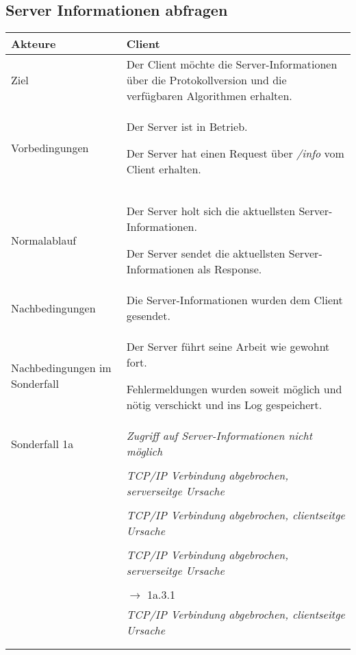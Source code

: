 \documentclass[a4paper,10pt,titlepage]{article}
\makeatletter
\newcommand\novspace{\@minipagetrue}
\newenvironment{owncompactitem}{%
\compactitem
}{%
\@finalstrut\@arstrutbox
\@nameuse{endcompactitem}%
\aftergroup\let\aftergroup\@finalstrut\aftergroup\@gobble
}
\newenvironment{owncompactenum}{%
\compactenum
}{%
\@finalstrut\@arstrutbox
\@nameuse{endcompactenum}%
\aftergroup\let\aftergroup\@finalstrut\aftergroup\@gobble
}
\newcommand{\usecase}[7]
{\subsection{#1}
\setlength{\extrarowheight}{2pt}
\begin{tabular}{|p{0.2\textwidth}|p{0.9\textwidth}|}
\hline
  Akteure & #2\\\hline
  Ziel & #3\\\hline
  Vorbedingungen & \novspace
  	\begin{owncompactitem}[-] #4 \end{owncompactitem} \\\hline
  Normalablauf & \vspace{-7pt}
  	\begin{owncompactenum}[1.] #6 \end{owncompactenum} \\\hline
  Nachbedingungen & \novspace
  	\begin{owncompactitem}[-] #5 \end{owncompactitem} \\\hline
  #7
\end{tabular}
}
\newcommand{\sonderfall}[4][\empty]
{
Sonderfall #2 & \vspace{-10pt}
	\textit{#3}
	\begin{owncompactenum}[{#2}.1] {#4} \end{owncompactenum}
  	\ifthenelse{\equal{#1}{\empty}}
    	{\\\hline} %
    	{\ensuremath{\rightarrow} #1 \\ [+1pt] \hline} %

}
\newcommand{\kurzersonderfall}[3][\empty]
{
Sonderfall #2 & \vspace{-10pt}
	\textit{#3}
  	\ifthenelse{\equal{#1}{\empty}}
    	{\\\hline} %
    	{\\&\ensuremath{\rightarrow} #1 \\ [+1pt] \hline} %

}
\newcommand{\sondernachbedingung}[1]
{
Nachbedingungen im Sonderfall& \novspace
	\begin{owncompactitem}[-]
		#1
	\end{owncompactitem} \\\hline
}
\makeatother
\begin{document}
\usecase{Server Informationen abfragen}{Client}%
{%
Der Client möchte die Server-Informationen über die Protokollversion und die verfügbaren Algorithmen erhalten.
}{%
\item Der Server ist in Betrieb.
\item Der Server hat einen Request über \textit{/info} vom Client erhalten.
}{%
\item Die Server-Informationen wurden dem Client gesendet.
}{%
\item Der Server holt sich die aktuellsten Server-Informationen.
\item Der Server sendet die aktuellsten Server-Informationen als Response.
}{%
\sondernachbedingung{
	\item Der Server führt seine Arbeit wie gewohnt fort.
	\item Fehlermeldungen wurden soweit möglich und nötig verschickt und ins Log gespeichert.}

\sonderfall{1a}%
	{%
	Zugriff auf Server-Informationen nicht möglich
	}{%
	\item Fehlermeldung "`Zugriff auf Server-Informationen nicht möglich"' ins Log schreiben
  	\item Fehlermeldung "`Zugriff auf Server-Informationen nicht möglich"' an Admins verschicken
  	\item Fehlermeldung an Client schicken}

\sonderfall{1a.3a}%
	{%
	TCP/IP Verbindung abgebrochen, serverseitge Ursache
	}{%
	\item Fehlermeldung "`Serverseitiger Internetausfall"' ins Log schreiben
  	\item Fehlermeldung "`Serverseitiger Internetausfall"' an Admins verschicken}

\sonderfall{1a.3b}%
	{%
	TCP/IP Verbindung abgebrochen, clientseitge Ursache
	}{%
	\item Der Fehler "Clientseitiger Verbindungsabbruch" wird ins Log geschrieben.}
  	
\kurzersonderfall[1a.3.1]{2a}%
	{%
	TCP/IP Verbindung abgebrochen, serverseitge Ursache}
	
\sonderfall{2b}%
	{%
	TCP/IP Verbindung abgebrochen, clientseitge Ursache
	}{%
	\item Der Fehler "Clientseitiger Verbindungsabbruch" wird ins Log geschrieben.}
}
\end{document}
